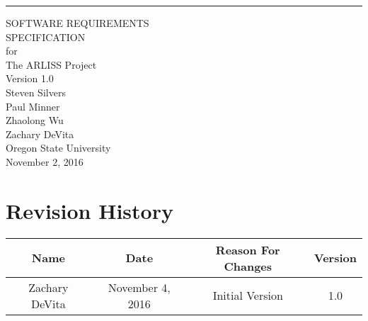 \documentclass[10pt,onecolumn,draftclsnofoot,document]{IEEEtran}
\begin{document}


\def\myversion{1.0 }

\begin{flushright}
    	\rule{16cm}{5pt}\vskip1cm
    	\begin{bfseries}
        		\Huge{SOFTWARE REQUIREMENTS\\ SPECIFICATION}\\
        		\vspace{1.9cm}
        			for\\
        		\vspace{1.9cm}
        			The ARLISS Project\\
        		\vspace{1.9cm}
        		\LARGE{Version \myversion}\\
        		\vspace{1.9cm}
        			Steven Silvers\\
			Paul Minner\\
        			Zhaolong Wu\\
			Zachary DeVita\\
        		\vspace{2.5cm}
        			Oregon State University\\
        			November 2, 2016\\
		\vspace{1.9cm}
    	\end{bfseries}
\end{flushright}
\clearpage

\setcounter{tocdepth}{3}


\tableofcontents





\clearpage


\section*{\hfill Revision History\hfill}
\begin{center}
    	\begin{tabular}{|c|c|c|c|}
        		\hline
	    		Name & Date & Reason For Changes & Version\\
        		\hline
	    		Zachary DeVita & November 4, 2016 & Initial Version & 1.0\\
        		\hline
    	\end{tabular}
\end{center}
\end{document}
